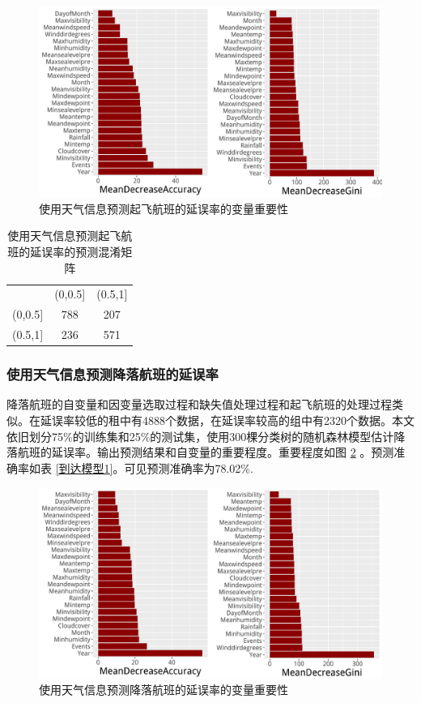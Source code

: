 \documentclass[12pt,a4paper,onecolumn]{article}
\begin{document}
\begin{figure}[H]
	\centering
	\includegraphics[width=400pt]{起飞模型1imp.pdf}
	\caption{使用天气信息预测起飞航班的延误率的变量重要性}
  \label{起飞模型1imp}
\end{figure}

\begin{table}[H]
	\centering
	\caption{使用天气信息预测起飞航班的延误率的预测混淆矩阵}
	\begin{tabular}{ccc}
		\hline
		   &  (0,0.5]  & (0.5,1]  \\
	     (0,0.5] & 788 & 207   \\
		 (0.5,1] & 236 & 571   \\\hline
	\end{tabular}
	\label{起飞模型1}
\end{table}

\subsubsection{使用天气信息预测降落航班的延误率}

降落航班的自变量和因变量选取过程和缺失值处理过程和起飞航班的处理过程类似。在延误率较低的租中有4888个数据，在延误率较高的组中有2320个数据。本文依旧划分75\%的训练集和25\%的测试集，使用300棵分类树的随机森林模型估计降落航班的延误率。输出预测结果和自变量的重要程度。重要程度如图 \ref{到达模型1imp} 。预测准确率如表 \ref{到达模型1}。可见预测准确率为78.02\%.

\begin{figure}[H]
	\centering
	\includegraphics[width=400pt]{到达模型1imp.pdf}
	\caption{使用天气信息预测降落航班的延误率的变量重要性}
  \label{到达模型1imp}
\end{figure}
\end{document}
